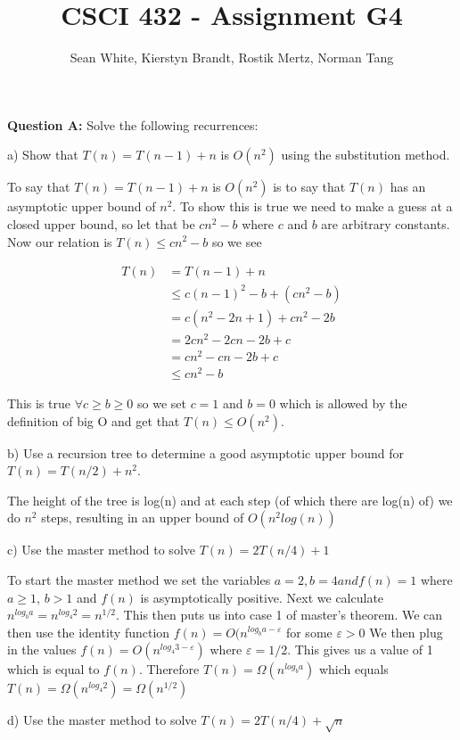 \documentclass[12pt]{article}
\author{Sean White, Kierstyn Brandt, Rostik Mertz, Norman Tang}
\title{CSCI 432 - Assignment G4}
\begin{document}
\maketitle

\noindent
\textbf{Question A:} Solve the following recurrences: \smallskip

a) Show that $T(n) = T(n - 1) + n$ is $O(n^2)$ using the substitution method.\smallskip

To say that $T(n) = T(n - 1) + n$ is $O(n^2)$ is to say that $T(n)$ has an asymptotic upper bound of $n^2$. To show this is true we need to make a guess at a closed upper bound, so let that be $cn^2 - b$ where $c$ and $b$ are arbitrary constants. Now our relation is $T(n) \leq cn^2 -b$ so we see

\begin{align*}
T(n) &= T(n - 1) + n\\
&\leq c(n-1)^2 - b + (cn^2 - b)\\
&= c(n^2 - 2n + 1) + cn^2 -2b\\
&= 2cn^2 - 2cn - 2b + c\\
&= cn^2 - cn - 2b + c\\
&\leq cn^2 - b
\end{align*}

This is true $\forall c \geq b \geq 0$ so we set $c = 1$ and $b = 0$ which is allowed by the definition of big O and get that $T(n) \leq O(n^2)$.
\bigskip

b) Use a recursion tree to determine a good asymptotic upper bound for $T(n) = T(n/2) + n^2$. \smallskip

The height of the tree is log(n) and at each step (of which there are log(n) of) we do $n^2$ steps, resulting in an upper bound of $O(n^2log(n))$ \bigskip

c) Use the master method to solve $T(n) = 2T(n/4) + 1$ \smallskip

To start the master method we set the variables $a=2, b=4 and f(n) = 1$ where $a \geq 1$, $b > 1$ and $f(n)$ is asymptotically positive. Next we calculate $n^{log_b a} = n^{log_4 2} = n^{1/2}$. This then puts us into case 1 of master's theorem. We can then use the identity function $f(n) = O(n^{log_b a - \varepsilon}$ for some $\varepsilon > 0$ We then plug in the values
 $f(n) = O (n^{log_4 3 - \varepsilon })$ where $\varepsilon = 1/2$. This gives us a value of 1 which is equal to $f(n)$. Therefore $T(n) = \Omega(n^{log_b a})$ which equals $T(n)=\Omega(n^{log_4 2}) = \Omega(n^{1/2})$
 \bigskip
 
d) Use the master method to solve $T(n) = 2T(n/4) + \sqrt{n}$ \smallskip
\end{document}
